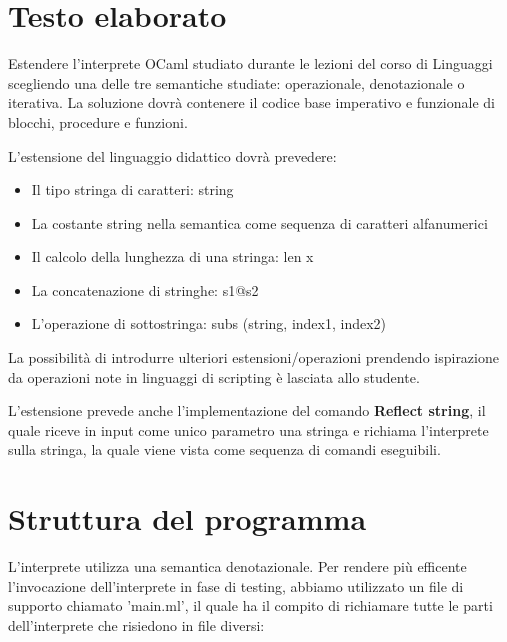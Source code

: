 \documentclass[a4paper,titlepage]{book}
\begin{document}
\pagestyle{plain}

\begin{frontespizio}
\Titoletto{}
\Sottotitolo{}
\end{frontespizio}

\frontmatter
\tableofcontents

\mainmatter
\chapter{Testo elaborato}
Estendere l'interprete OCaml studiato durante le lezioni del corso di Linguaggi scegliendo una delle tre semantiche studiate:
operazionale, denotazionale o iterativa.
La soluzione dovr\`a contenere il codice base imperativo e funzionale di blocchi, procedure e funzioni.

L'estensione del linguaggio didattico dovr\`a prevedere:
\begin{itemize}
\item Il tipo stringa di caratteri: string
\item La costante string nella semantica come sequenza di caratteri alfanumerici
\item Il calcolo della lunghezza di una stringa: len x
\item La concatenazione di stringhe: s1@s2
\item L'operazione di sottostringa: subs (string, index1, index2)
\end{itemize}

La possibilit\`a di introdurre ulteriori estensioni/operazioni prendendo ispirazione da operazioni note in linguaggi di scripting
\`e lasciata allo studente.

L'estensione prevede anche l'implementazione del comando \textbf{Reflect string}, il quale riceve in input come unico parametro
una stringa e richiama l'interprete sulla stringa, la quale viene vista come sequenza di comandi eseguibili.

\chapter{Struttura del programma}
L'interprete utilizza una semantica denotazionale.
Per rendere pi\`u efficente l'invocazione dell'interprete in fase di testing, abbiamo utilizzato un file di supporto chiamato 'main.ml',
il quale ha il compito di richiamare tutte le parti dell'interprete che risiedono in file diversi:
\end{document}
